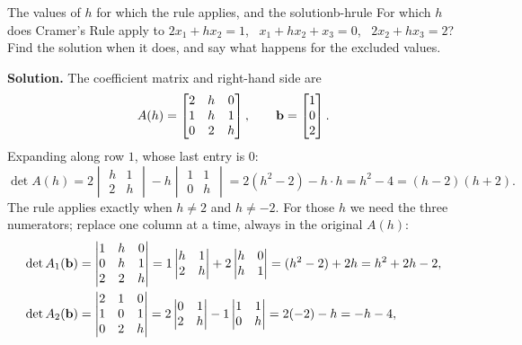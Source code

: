 \documentclass[11pt]{article}
\begin{document}
\begin{exmp}{The values of $h$ for which the rule applies, and the solution}{b-hrule}
For which $h$ does Cramer's Rule apply to $2x_1+hx_2=1$, \ $x_1+hx_2+x_3=0$, \ $2x_2+hx_3=2$? Find the solution when it does, and say what happens for the excluded values.

\textbf{Solution.} The coefficient matrix and right-hand side are
\[
A(h)=\begin{bmatrix}2&h&0\\1&h&1\\0&2&h\end{bmatrix},\qquad\mathbf{b}=\begin{bmatrix}1\\0\\2\end{bmatrix}.
\]
Expanding along row $1$, whose last entry is $0$:
\[
\det A(h)=2\begin{vmatrix}h&1\\2&h\end{vmatrix}-h\begin{vmatrix}1&1\\0&h\end{vmatrix}=2(h^2-2)-h\cdot h=h^2-4=(h-2)(h+2).
\]
The rule applies exactly when $h\neq2$ and $h\neq-2$. For those $h$ we need the three numerators; replace one column at a time, always in the original $A(h)$:
\begin{align*}
\det A_1(\bv{b})&=\begin{vmatrix}1&h&0\\0&h&1\\2&2&h\end{vmatrix}=1\begin{vmatrix}h&1\\2&h\end{vmatrix}+2\begin{vmatrix}h&0\\h&1\end{vmatrix}=(h^2-2)+2h=h^2+2h-2,\\
\det A_2(\bv{b})&=\begin{vmatrix}2&1&0\\1&0&1\\0&2&h\end{vmatrix}=2\begin{vmatrix}0&1\\2&h\end{vmatrix}-1\begin{vmatrix}1&1\\0&h\end{vmatrix}=2(-2)-h=-h-4,\\

\end{align*}
\end{exmp}
\end{document}

